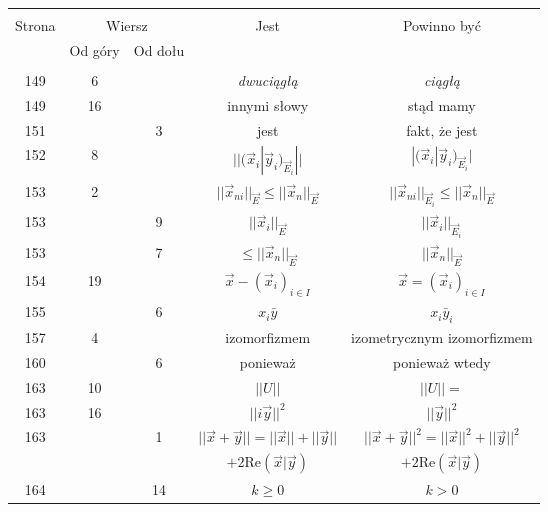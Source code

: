 \documentclass[a4paper,11pt]{article}
\begin{document}
\begin{center}
  \begin{tabular}{|c|c|c|c|c|}
    \hline
    & \multicolumn{2}{c|}{} & & \\
    Strona & \multicolumn{2}{c|}{Wiersz}& Jest & Powinno być \\ \cline{2-3}
    & Od góry & Od dołu &  &  \\ \hline
    & & & & \\
    149 &  6 & & \emph{dwuciągłą} & \emph{ciągłą} \\
    149 & 16 & & innymi słowy & stąd mamy \\
    151 & &  3 & jest & fakt, że jest \\
    152 &  8 & & $|| ( \vec{ x }_{ i } | \vec{ y }_{ i }
                 )_{ \vec{ E }_{ i } } ||$
           & $| ( \vec{ x }_{ i } | \vec{ y }_{ i }
             )_{ \vec{ E }_{ i } } |$ \\
    153 &  2 & & $|| \vec{ x }_{ ni } ||_{ \vec{ E } } \leq ||
                 \vec{ x }_{ n } ||_{ \vec{ E } }$
           & $|| \vec{ x }_{ ni } ||_{ \vec{ E }_{ i } } \leq ||
             \vec{ x }_{ n } ||_{ \vec{ E } }$ \\
    153 & &  9 & $|| \vec{ x }_{ i } ||_{ \vec{ E } }$
           & $|| \vec{ x }_{ i } ||_{ \vec{ E }_{ i } }$ \\
    153 & &  7 & $\leq || \vec{ x }_{ n } ||_{ \vec{ E } }$
           & $|| \vec{ x }_{ n } ||_{ \vec{ E } }$ \\
    154 & 19 & & $\vec{ x } - ( \vec{ x }_{ i } )_{ i \in I }$
           & $\vec{ x } = ( \vec{ x }_{ i } )_{ i \in I }$ \\
    155 & &  6 & $x_{ i } \bar{ y }$ & $x_{ i } \bar{ y }_{ i }$ \\
    157 &  4 & & izomorfizmem & izometrycznym izomorfizmem \\
    160 & &  6 & ponieważ & ponieważ wtedy \\
    163 & 10 & & $|| U ||$ & $|| U || =$ \\
    163 & 16 & & $|| i\vec{ y } ||^{ 2 }$ & $|| \vec{ y } ||^{ 2 }$ \\
    163 & &  1 & $|| \vec{ x } + \vec{ y } || = || \vec{ x } ||
                 + || \vec{ y } ||$
           & $|| \vec{ x } + \vec{ y } ||^{ 2 } = || \vec{ x } ||^{ 2 }
             + || \vec{ y } ||^{ 2 }$ \\
    & & &  $+ 2 \mathrm{Re}( \vec{ x } | \vec{ y } )$
           & $+ 2 \mathrm{Re}( \vec{ x } | \vec{ y } )$ \\
    164 & & 14 & $k \geq 0$ & $k > 0$ \\

\end{tabular}
\end{center}
\end{document}

